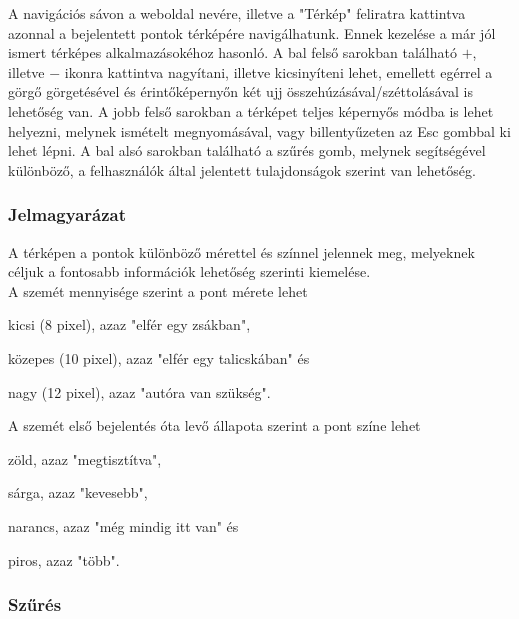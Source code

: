 A navigációs sávon a weboldal nevére, illetve a "Térkép" feliratra kattintva azonnal a bejelentett pontok térképére navigálhatunk. Ennek kezelése a már jól ismert térképes alkalmazásokéhoz hasonló. A bal felső sarokban található \hspace{0.1cm}\boldmath\(+\)\hspace{0.1cm}, illetve \hspace{0.1cm}\boldmath\(-\)\hspace{0.1cm} ikonra kattintva nagyítani, illetve kicsinyíteni lehet, emellett egérrel a görgő görgetésével és érintőképernyőn két ujj összehúzásával/széttolásával is lehetőség van. A jobb felső sarokban a térképet teljes képernyős módba is lehet helyezni, melynek ismételt megnyomásával, vagy billentyűzeten az Esc gombbal ki lehet lépni. A bal alsó sarokban található a szűrés gomb, melynek segítségével különböző, a felhasználók által jelentett tulajdonságok szerint van lehetőség.

\subsubsection{Jelmagyarázat}

A térképen a pontok különböző mérettel és színnel jelennek meg, melyeknek céljuk a fontosabb információk lehetőség szerinti kiemelése.\\
A szemét mennyisége szerint a pont mérete lehet
\begin{compactitem}
	\item[\large\textbullet] kicsi (8 pixel), azaz "elfér egy zsákban",
	\item[\Large\textbullet] közepes (10 pixel), azaz "elfér egy talicskában" és
	\item[\LARGE\textbullet] nagy (12 pixel), azaz "autóra van szükség".
\end{compactitem}
A szemét első bejelentés óta levő állapota szerint a pont színe lehet
\begin{compactitem}
	\item[\textcolor{tt_green}{\Large\textbullet}] zöld, azaz "megtisztítva",
	\item[\textcolor{tt_yellow}{\Large\textbullet}] sárga, azaz "kevesebb",
	\item[\textcolor{tt_orange}{\Large\textbullet}] narancs, azaz "még mindig itt van" és
	\item[\textcolor{tt_red}{\Large\textbullet}] piros, azaz "több".
\end{compactitem}

\subsubsection{Szűrés}

